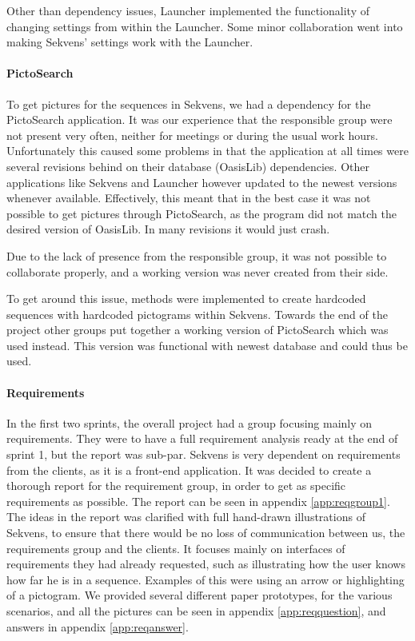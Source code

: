 Other than dependency issues, Launcher implemented the functionality of changing settings from within the Launcher. Some minor collaboration went into making Sekvens' settings work with the Launcher.

\paragraph{PictoSearch}
To get pictures for the sequences in Sekvens, we had a dependency for the PictoSearch application. It was our experience that the responsible group were not present very often, neither for meetings or during the usual work hours. Unfortunately this caused some problems in that the application at all times were several revisions behind on their database (OasisLib) dependencies. Other applications like Sekvens and Launcher however updated to the newest versions whenever available. Effectively, this meant that in the best case it was not possible to get pictures through PictoSearch, as the program did not match the desired version of OasisLib. In many revisions it would just crash.

Due to the lack of presence from the responsible group, it was not possible to collaborate properly, and a working version was never created from their side.

To get around this issue, methods were implemented to create hardcoded sequences with hardcoded pictograms within Sekvens. Towards the end of the project other groups put together a working version of PictoSearch which was used instead. This version was functional with newest database and could thus be used.

\paragraph{Requirements}
In the first two sprints, the overall project had a group focusing mainly on requirements. They were to have a full requirement analysis ready at the end of sprint 1, but the report was sub-par. Sekvens is very dependent on requirements from the clients, as it is a front-end application. It was decided to create a thorough report for the requirement group, in order to get as specific requirements as possible. The report can be seen in appendix \ref{app:reqgroup1}. The ideas in the report was clarified with full hand-drawn illustrations of Sekvens, to ensure that there would be no loss of communication between us, the requirements group and the clients. It focuses mainly on interfaces of requirements they had already requested, such as illustrating how the user knows how far he is in a sequence. Examples of this were using an arrow or highlighting of a pictogram. We provided several different paper prototypes, for the various scenarios, and all the pictures can be seen in appendix \ref{app:reqquestion}, and answers in appendix \ref{app:reqanswer}.